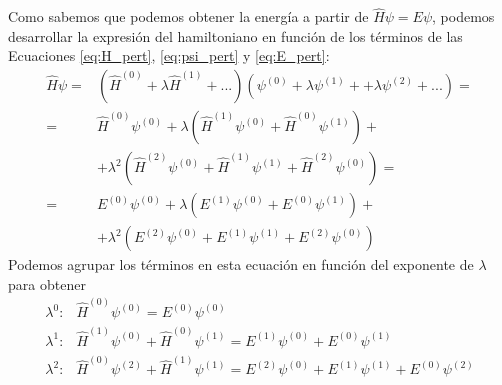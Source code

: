 \documentclass{tufte-handout}
\begin{document}
Como sabemos que podemos obtener la energía
a partir de $\hat{H}\psi = E\psi$, podemos desarrollar la 
expresión del hamiltoniano en función de los términos de las Ecuaciones
\ref{eq:H_pert}, \ref{eq:psi_pert} y \ref{eq:E_pert}:
\begin{equation}
\begin{split}
    \hat{H}\psi =& (\hat{H}^{(0)} + \lambda \hat{H}^{(1)} + ...)(\psi^{(0)} + \lambda\psi^{(1)} +  + \lambda\psi^{(2)} + ...) = \\
    =& \hat{H}^{(0)}\psi^{(0)} + 
    \lambda (\hat{H}^{(1)}\psi^{(0)} + \hat{H}^{(0)}\psi^{(1)}) + \\ 
    &+ \lambda^2 (\hat{H}^{(2)}\psi^{(0)} + \hat{H}^{(1)}\psi^{(1)} + \hat{H}^{(2)}\psi^{(0)} ) =  \\
    =& E^{(0)}\psi^{(0)} + \lambda (E^{(1)}\psi^{(0)} + E^{(0)}\psi^{(1)}) + \\
    &+ \lambda^2 (E^{(2)}\psi^{(0)} + E^{(1)}\psi^{(1)} + E^{(2)}\psi^{(0)})
\end{split}
\end{equation}
Podemos agrupar los términos en esta ecuación en función del
exponente de $\lambda$ para obtener
\begin{align}
    \lambda^0\mathrm{:} & \hat{H}^{(0)}\psi^{(0)}= E^{(0)}\psi^{(0)}\label{eq:HE_pert0}\\
    \lambda^1\mathrm{:}&
    \hat{H}^{(1)}\psi^{(0)} + \hat{H}^{(0)}\psi^{(1)} = E^{(1)}\psi^{(0)} + E^{(0)}\psi^{(1)} \label{eq:HE_pert1}\\
    \lambda^2\mathrm{:}  &     
     \hat{H}^{(0)}\psi^{(2)} + \hat{H}^{(1)}\psi^{(1)} = E^{(2)}\psi^{(0)} + E^{(1)}\psi^{(1)}+ E^{(0)}\psi^{(2)}
\end{align}
\end{document}

